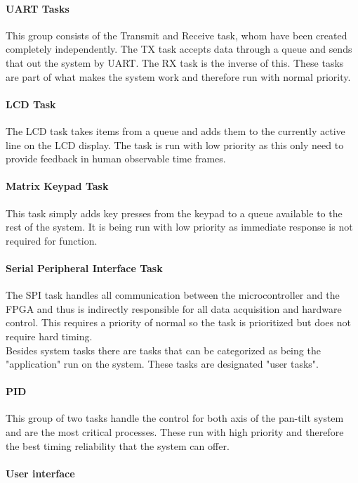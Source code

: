 \documentclass[../../../main]{subfiles}
\begin{document}
\paragraph{UART Tasks}%

This group consists of the Transmit and Receive task, whom have been created completely independently. The TX task accepts data through a queue and sends that out the system by UART. The RX task is the inverse of this. These tasks are part of what makes the system work and therefore run with normal priority.

\paragraph{LCD Task}

The LCD task takes items from a queue and adds them to the currently active line on the LCD display. The task is run with low  priority as this only need to provide feedback in human observable time frames.

\paragraph{Matrix Keypad Task}

This task simply adds key presses from the keypad to a queue available to the rest of the system. It is being run with low priority as immediate response is not required for function.

\paragraph{Serial Peripheral Interface Task}

The SPI task handles all communication between the microcontroller and the FPGA and thus is indirectly responsible for all data acquisition and hardware control. This requires a priority of normal so the task is prioritized but does not require hard timing.\\

Besides system tasks there are tasks that can be categorized as being the "application" run on the system. These tasks are designated "user tasks".

\paragraph{PID}

This group of two tasks handle the control for both axis of the pan-tilt system and are the most critical processes. These run with high priority and therefore the best timing reliability that the system can offer.

\paragraph{User interface}
\end{document}
